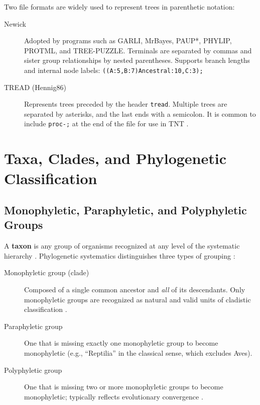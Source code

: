 Two file formats are widely used to represent trees in parenthetic notation:

\begin{description}
    \item[Newick] Adopted by programs such as GARLI, MrBayes, PAUP*, PHYLIP, PROTML, and TREE-PUZZLE. Terminals are separated by commas and sister group relationships by nested parentheses. Supports branch lengths and internal node labels: \texttt{((A:5,B:7)Ancestral:10,C:3);}

    \item[TREAD (Hennig86)] Represents trees preceded by the header \texttt{tread}. Multiple trees are separated by asterisks, and the last ends with a semicolon. It is common to include \texttt{proc-;} at the end of the file for use in TNT \parencite{goloboff2008}.
\end{description}

\section{Taxa, Clades, and Phylogenetic Classification}

\subsection{Monophyletic, Paraphyletic, and Polyphyletic Groups}

A \textbf{taxon} is any group of organisms recognized at any level of the systematic hierarchy \parencite{schuh2009}. Phylogenetic systematics distinguishes three types of grouping \parencite{hennig1966,schuh2009}:

\begin{description}
    \item[Monophyletic group (clade)] Composed of a single common ancestor and \emph{all} of its descendants. Only monophyletic groups are recognized as natural and valid units of cladistic classification \parencite{hennig1966}.

    \item[Paraphyletic group] One that is missing exactly one monophyletic group to become monophyletic (e.g., ``Reptilia'' in the classical sense, which excludes Aves).

    \item[Polyphyletic group] One that is missing two or more monophyletic groups to become monophyletic; typically reflects evolutionary convergence \parencite{schuh2009}.
\end{description}

